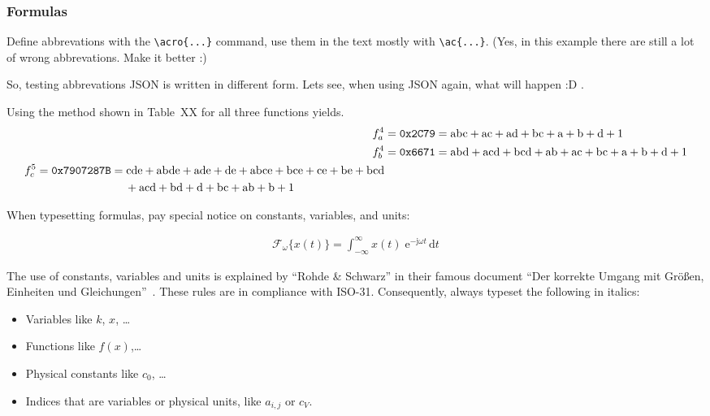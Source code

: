 \subsubsection{Formulas}

Define abbrevations with the \verb+\acro{...}+ command, use them in the text mostly with \verb+\ac{...}+. (Yes, in this example there are still a lot of wrong abbrevations. Make it better :)

So, testing abbrevations \ac{JSON} is written in different form. Lets see, when using \ac{JSON} again, what will happen :D .

Using the method shown in Table~XX for all three functions yields.
\begin{align}
f_a^4 &= \mathrm{\texttt{0x2C79}} = \mathrm{abc} + \mathrm{ac} + \mathrm{ad} + \mathrm{bc} + \mathrm{a} + \mathrm{b} + \mathrm{d} + \mathrm{1} \\
f_b^4 &= \mathrm{\texttt{0x6671}} = \mathrm{abd} + \mathrm{acd} + \mathrm{bcd} + \mathrm{ab} + \mathrm{ac} + \mathrm{bc} + \mathrm{a} + \mathrm{b} + \mathrm{d} + \mathrm{1}\\
\begin{split}
f_c^5 &= \mathrm{\texttt{0x7907287B}} = \mathrm{cde} + \mathrm{abde} + \mathrm{ade} + \mathrm{de} + \mathrm{abce} + \mathrm{bce} + \mathrm{ce} + \mathrm{be} + \mathrm{bcd}\\
&\hspace{2.75cm}+ \mathrm{acd} +\mathrm{bd} + \mathrm{d} + \mathrm{bc} + \mathrm{ab} + \mathrm{b} + \mathrm{1}
\end{split}
\end{align}

When typesetting formulas, pay special notice on constants, variables, and units:

 \begin{align}
  \mathcal{F}_{\omega}\{x(t)\} = \int^{\infty}_{-\infty} x(t) \;\mathrm{e}^{-\mathrm{j} \omega t}\,\mathrm{d}t
  \tag{Fourier-Transformation} %
  \end{align}
  
The use of constants, variables and units is explained by \enquote{Rohde \& Schwarz} in their famous document \enquote{Der korrekte Umgang mit Gr\"{o}\ss{}en, Einheiten und Gleichungen}~\cite{steuck2002xxe}. These rules are in compliance with ISO-31. Consequently, always typeset the following in italics:

\begin{itemize}
\item Variables like $k$, $x$, \dots
\item Functions like $f(x)$,\dots
\item Physical constants like $c_0$, \dots
\item Indices that are variables or physical units, like $a_{i, j}$ or $c_V$.
\end{itemize}

